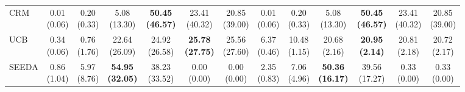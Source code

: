 {\begin{tabular}{l|cccccc|cccccc}
CRM & \makecell{0.01 \\ (0.06)} & \makecell{0.20 \\ (0.33)} & {\cellcolor[HTML]{C8E6C9}} \makecell{5.08 \\ (13.30)} & \bfseries \makecell{50.45 \\ (46.57)} & \makecell{23.41 \\ (40.32)} & \makecell{20.85 \\ (39.00)} & \makecell{0.01 \\ (0.06)} & \makecell{0.20 \\ (0.33)} & {\cellcolor[HTML]{C8E6C9}} \makecell{5.08 \\ (13.30)} & \bfseries \makecell{50.45 \\ (46.57)} & \makecell{23.41 \\ (40.32)} & \makecell{20.85 \\ (39.00)} \\
UCB & \makecell{0.34 \\ (0.06)} & \makecell{0.76 \\ (1.76)} & {\cellcolor[HTML]{C8E6C9}} \makecell{22.64 \\ (26.09)} & \makecell{24.92 \\ (26.58)} & \bfseries \makecell{25.78 \\ (27.75)} & \makecell{25.56 \\ (27.60)} & \makecell{6.37 \\ (0.46)} & \makecell{10.48 \\ (1.15)} & {\cellcolor[HTML]{C8E6C9}} \makecell{20.68 \\ (2.16)} & \bfseries \makecell{20.95 \\ (2.14)} & \makecell{20.81 \\ (2.18)} & \makecell{20.72 \\ (2.17)} \\
SEEDA & \makecell{0.86 \\ (1.04)} & \makecell{5.97 \\ (8.76)} & {\cellcolor[HTML]{C8E6C9}} \bfseries \makecell{54.95 \\ (32.05)} & \makecell{38.23 \\ (33.52)} & \makecell{0.00 \\ (0.00)} & \makecell{0.00 \\ (0.00)} & \makecell{2.35 \\ (0.83)} & \makecell{7.06 \\ (4.96)} & {\cellcolor[HTML]{C8E6C9}} \bfseries \makecell{50.36 \\ (16.17)} & \makecell{39.56 \\ (17.27)} & \makecell{0.33 \\ (0.00)} & \makecell{0.33 \\ (0.00)} \\

\end{tabular}}
